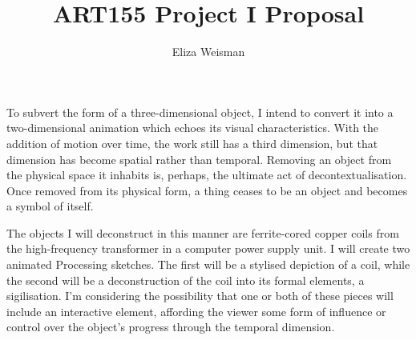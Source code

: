\documentclass[a4paper,12pt]{article}
\title{ART155 Project I Proposal}
\author{Eliza Weisman}
\begin{document}
\maketitle
To subvert the form of a three-dimensional object, I intend to convert it into a two-dimensional animation which echoes its visual characteristics. With the addition of motion over time, the work still has a third dimension, but that dimension has become spatial rather than temporal. Removing an object from the physical space it inhabits is, perhaps, the ultimate act of decontextualisation. Once removed from its physical form, a thing ceases to be an object and becomes a symbol of itself.

The objects I will deconstruct in this manner are ferrite-cored copper coils from the high-frequency transformer in a computer power supply unit. I will create two animated Processing sketches. The first will be a stylised depiction of a coil, while the second will be a deconstruction of the coil into its formal elements, a sigilisation. I'm considering the possibility that one or both of these pieces will include an interactive element, affording the viewer some form of influence or control over the object's progress through the temporal dimension.
\end{document}
